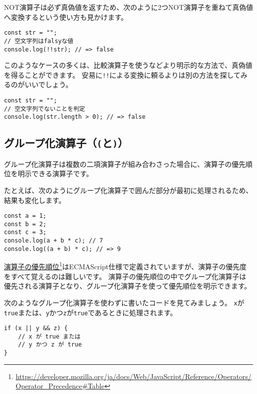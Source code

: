 NOT演算子は必ず真偽値を返すため、次のように2つNOT演算子を重ねて真偽値へ変換するという使い方も見かけます。

\begin{lstlisting}
const str = "";
// 空文字列はfalsyな値
console.log(!!str); // => false
\end{lstlisting}

このようなケースの多くは、比較演算子を使うなどより明示的な方法で、真偽値を得ることができます。
安易に\texttt{!!}による変換に頼るよりは別の方法を探してみるのがいいでしょう。

\begin{lstlisting}
const str = "";
// 空文字列でないことを判定
console.log(str.length > 0); // => false
\end{lstlisting}

\hypertarget{group-operator}{%
\subsection{\texorpdfstring{グループ化演算子（\texttt{(}と\texttt{)}）}{グループ化演算子（(と)）}}\label{group-operator}}

グループ化演算子は複数の二項演算子が組み合わさった場合に、演算子の優先順位を明示できる演算子です。

たとえば、次のようにグループ化演算子で囲んだ部分が最初に処理されるため、結果も変化します。

\begin{lstlisting}
const a = 1;
const b = 2;
const c = 3;
console.log(a + b * c); // 7
console.log((a + b) * c); // => 9
\end{lstlisting}

\href{https://developer.mozilla.org/ja/docs/Web/JavaScript/Reference/Operators/Operator_Precedence\#Table}{演算子の優先順位}\footnote{\url{https://developer.mozilla.org/ja/docs/Web/JavaScript/Reference/Operators/Operator_Precedence\#Table}}はECMAScript仕様で定義されていますが、演算子の優先度をすべて覚えるのは難しいです。
演算子の優先順位の中でグループ化演算子は優先される演算子となり、グループ化演算子を使って優先順位を明示できます。

次のようなグループ化演算子を使わずに書いたコードを見てみましょう。
\texttt{x}が\texttt{true}または、\texttt{y}かつ\texttt{z}が\texttt{true}であるときに処理されます。

\begin{lstlisting}
if (x || y && z) {
    // x が true または
    // y かつ z が true
}
\end{lstlisting}

